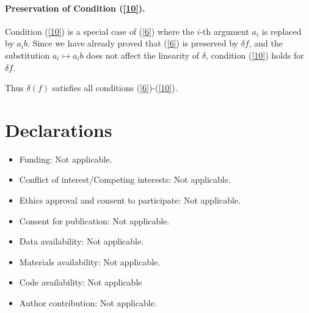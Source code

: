 \documentclass[pdflatex,sn-mathphys-num]{sn-jnl}%
\theoremstyle{thmstyleone}%
\theoremstyle{thmstyletwo}%
\theoremstyle{thmstylethree}%
\begin{document}
\medskip
\paragraph{Preservation of Condition (\ref{10}).}
Condition (\ref{10}) is a special case of (\ref{6}) where the $i$-th argument $a_i$ is replaced by $a_i b$. Since we have already proved that (\ref{6}) is preserved by $\delta f$, and the substitution $a_i \mapsto a_i b$ does not affect the linearity of $\delta$, condition (\ref{10}) holds for $\delta f$.

\medskip
Thus $\delta(f)$ satisfies all conditions (\ref{6})-(\ref{10}). 
\section*{Declarations}


\begin{itemize}
\item Funding: Not applicable.
\item Conflict of interest/Competing interests: Not applicable.
\item Ethics approval and consent to participate: Not applicable.
\item Consent for publication: Not applicable.
\item Data availability: Not applicable. 
\item Materials availability: Not applicable.
\item Code availability: Not applicable 
\item Author contribution: Not applicable.
\end{itemize}
\end{document}
